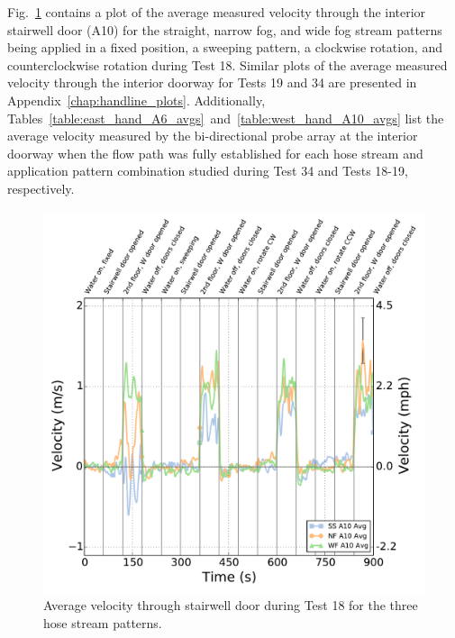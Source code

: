 \documentclass[12pt,oneside]{book}
\begin{document}
Fig.~\ref{fig:Test_18_BDP_A10_Avg_All} contains a plot of the average measured velocity through the interior stairwell door (A10) for the straight, narrow fog, and wide fog stream patterns being applied in a fixed position, a sweeping pattern, a clockwise rotation, and counterclockwise rotation during Test 18. Similar plots of the average measured velocity through the interior doorway for Tests 19 and 34 are presented in Appendix~\ref{chap:handline_plots}. Additionally, Tables~\ref{table:east_hand_A6_avgs}~and~\ref{table:west_hand_A10_avgs} list the average velocity measured by the bi-directional probe array at the interior doorway when the flow path was fully established for each hose stream and application pattern combination studied during Test 34 and Tests 18-19, respectively.

\begin{figure}[!ht]
	\includegraphics[width=\columnwidth]{../Figures/Plots/Test_18_West_063014_BDP_A10_stream_avgs}
	\caption{Average velocity through stairwell door during Test 18 for the three hose stream patterns.}
	\label{fig:Test_18_BDP_A10_Avg_All}
\end{figure}
\FloatBarrier

\end{document}
